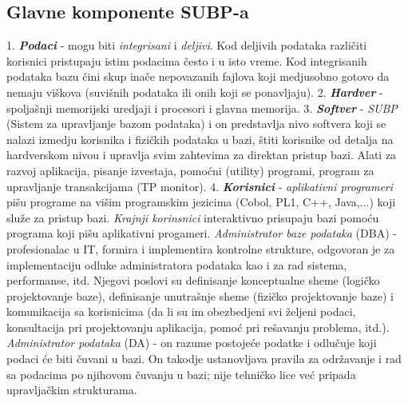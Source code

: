 \documentclass{article}
\begin{document}
\subsection{Glavne komponente SUBP-a}
\hspace*{0.2cm}
1. \textit{\textbf{Podaci}} - mogu biti \textit{integrisani} i
\textit{deljivi}. Kod deljivih
podataka različiti korisnici pristupaju istim podacima često i u isto vreme.
Kod integrisanih podataka bazu čini skup inače nepovazanih fajlova koji
medjusobno gotovo da nemaju viškova (suvišnih podataka ili onih koji se
ponavljaju).
\newline \hspace*{0.2cm}
2. \textit{\textbf{Hardver}} - spoljašnji memorijski uredjaji i procesori i
glavna memorija.
\newline \hspace*{0.2cm}
3. \textit{\textbf{Softver}}
- \textit{SUBP} (Sistem za upravljanje bazom podataka) i on predstavlja 
nivo softvera koji se nalazi izmedju korisnika i fizičkih podataka u bazi,
štiti korisnike od detalja na hardverskom nivou i upravlja svim zahtevima
za direktan pristup bazi. Alati za razvoj aplikacija, pisanje izvestaja,
pomoćni (utility) programi, program za upravljanje transakcijama (TP
monitor).
\newline \hspace*{0.2cm}
4. \textbf{\textit{Korisnici}} - \textit{aplikativni programeri} pišu
programe na višim programskim jezicima (Cobol, PL1, C++, Java,...) koji
služe za pristup bazi. \textit{Krajnji korinsnici} interaktivno prisupaju
bazi pomoću programa koji pišu aplikativni progameri. \textit{Administrator
baze podataka} (DBA) - profesionalac u IT, formira i implementira
kontrolne strukture, odgovoran je za implementaciju odluke administratora
podataka kao i za rad sistema, performanse, itd. Njegovi poslovi su
definisanje konceptualne sheme (logičko projektovanje baze), definisanje
unutrašnje sheme (fizičko projektovanje baze) i komunikacija sa korisnicima
(da li su im obezbedjeni svi željeni podaci, konsultacija pri projektovanju
aplikacija, pomoć pri rešavanju problema, itd.). \textit{Administrator
podataka} (DA) - on razume postojeće podatke i odlučuje koji podaci će
biti čuvani u bazi. On takodje ustanovljava pravila za održavanje i rad sa
podacima po njihovom čuvanju u bazi; nije tehničko lice već pripada
upravljačkim strukturama.
\end{document}
